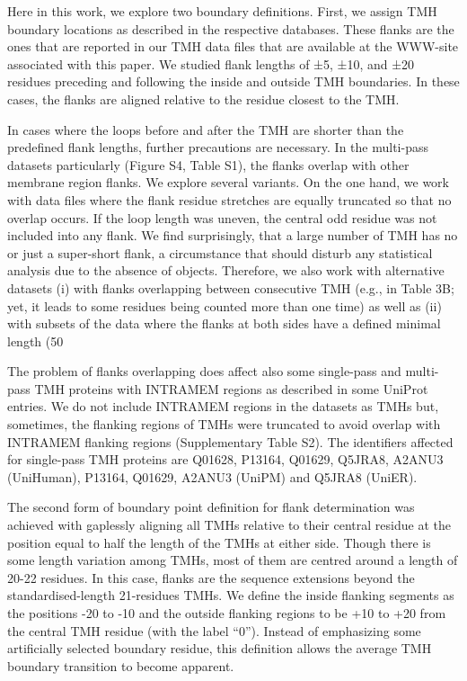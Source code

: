 Here in this work, we explore two boundary definitions. First, we assign TMH boundary locations as described in the respective databases. These flanks are the ones that are reported in our TMH data files that are available at the WWW-site associated with this paper. We studied flank lengths of ±5, ±10, and ±20 residues preceding and following the inside and outside TMH boundaries. In these cases, the flanks are aligned relative to the residue closest to the TMH.

In cases where the loops before and after the TMH are shorter than the predefined flank lengths, further precautions are necessary. In the multi-pass datasets particularly (Figure S4, Table S1), the flanks overlap with other membrane region flanks. We explore several variants. On the one hand, we work with data files where the flank residue stretches are equally truncated so that no overlap occurs. If the loop length was uneven, the central odd residue was not included into any flank. We find surprisingly, that a large number of TMH has no or just a super-short flank, a circumstance that should disturb any statistical analysis due to the absence of objects. Therefore, we also work with alternative datasets (i) with flanks overlapping between consecutive TMH (e.g., in Table 3B; yet, it leads to some residues being counted more than one time) as well as (ii) with subsets of the data where the flanks at both sides have a defined minimal length (50%

The problem of flanks overlapping does affect also some single-pass and multi-pass TMH proteins with INTRAMEM regions as described in some UniProt entries. We do not include INTRAMEM regions in the datasets as TMHs but, sometimes, the flanking regions of TMHs were truncated to avoid overlap with INTRAMEM flanking regions (Supplementary Table S2).  The identifiers affected for single-pass TMH proteins are Q01628, P13164, Q01629, Q5JRA8, A2ANU3 (UniHuman), P13164, Q01629, A2ANU3 (UniPM) and Q5JRA8 (UniER).

The second form of boundary point definition for flank determination was achieved with gaplessly aligning all TMHs relative to their central residue at the position equal to half the length of the TMHs at either side. Though there is some length variation among TMHs, most of them are centred around a length of 20-22 residues. In this case, flanks are the sequence extensions beyond the standardised-length 21-residues TMHs. We define the inside flanking segments as the positions -20 to -10 and the outside flanking regions to be +10 to +20 from the central TMH residue (with the label “0”). Instead of emphasizing some artificially selected boundary residue, this definition allows the average TMH boundary transition to become apparent.

